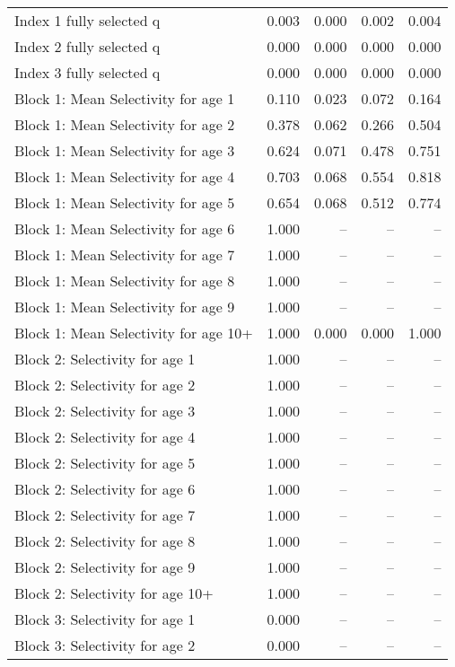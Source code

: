 \documentclass[
]{article}
\begin{document}
\begin{landscape}
\begin{longtable}[t]{lrrrr}
\endfoot
\bottomrule
\endlastfoot
Index 1 fully selected q & 0.003 & 0.000 & 0.002 & 0.004\\
Index 2 fully selected q & 0.000 & 0.000 & 0.000 & 0.000\\
Index 3 fully selected q & 0.000 & 0.000 & 0.000 & 0.000\\
Block 1: Mean Selectivity for age 1 & 0.110 & 0.023 & 0.072 & 0.164\\
Block 1: Mean Selectivity for age 2 & 0.378 & 0.062 & 0.266 & 0.504\\
\addlinespace
Block 1: Mean Selectivity for age 3 & 0.624 & 0.071 & 0.478 & 0.751\\
Block 1: Mean Selectivity for age 4 & 0.703 & 0.068 & 0.554 & 0.818\\
Block 1: Mean Selectivity for age 5 & 0.654 & 0.068 & 0.512 & 0.774\\
Block 1: Mean Selectivity for age 6 & 1.000 & -- & -- & --\\
Block 1: Mean Selectivity for age 7 & 1.000 & -- & -- & --\\
\addlinespace
Block 1: Mean Selectivity for age 8 & 1.000 & -- & -- & --\\
Block 1: Mean Selectivity for age 9 & 1.000 & -- & -- & --\\
Block 1: Mean Selectivity for age 10+ & 1.000 & 0.000 & 0.000 & 1.000\\
Block 2: Selectivity for age 1 & 1.000 & -- & -- & --\\
Block 2: Selectivity for age 2 & 1.000 & -- & -- & --\\
\addlinespace
Block 2: Selectivity for age 3 & 1.000 & -- & -- & --\\
Block 2: Selectivity for age 4 & 1.000 & -- & -- & --\\
Block 2: Selectivity for age 5 & 1.000 & -- & -- & --\\
Block 2: Selectivity for age 6 & 1.000 & -- & -- & --\\
Block 2: Selectivity for age 7 & 1.000 & -- & -- & --\\
\addlinespace
Block 2: Selectivity for age 8 & 1.000 & -- & -- & --\\
Block 2: Selectivity for age 9 & 1.000 & -- & -- & --\\
Block 2: Selectivity for age 10+ & 1.000 & -- & -- & --\\
Block 3: Selectivity for age 1 & 0.000 & -- & -- & --\\
Block 3: Selectivity for age 2 & 0.000 & -- & -- & --\\

\end{longtable}
\end{landscape}
\end{document}
